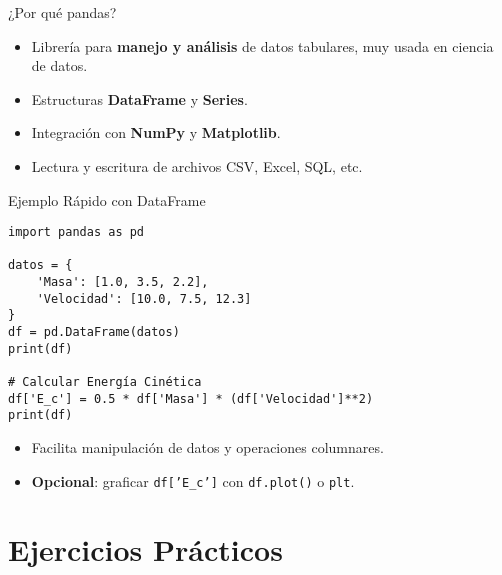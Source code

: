 \documentclass[10pt]{beamer}
\begin{document}
\begin{frame}{¿Por qué pandas?}
  \begin{itemize}
    \item Librería para \textbf{manejo y análisis} de datos tabulares, muy usada en ciencia de datos.
    \item Estructuras \textbf{DataFrame} y \textbf{Series}.
    \item Integración con \textbf{NumPy} y \textbf{Matplotlib}.
    \item Lectura y escritura de archivos CSV, Excel, SQL, etc.
  \end{itemize}
\end{frame}

\begin{frame}[fragile]{Ejemplo Rápido con DataFrame}
\begin{verbatim}
import pandas as pd

datos = {
    'Masa': [1.0, 3.5, 2.2],
    'Velocidad': [10.0, 7.5, 12.3]
}
df = pd.DataFrame(datos)
print(df)

# Calcular Energía Cinética
df['E_c'] = 0.5 * df['Masa'] * (df['Velocidad']**2)
print(df)
\end{verbatim}
\begin{itemize}
  \item Facilita manipulación de datos y operaciones columnares.
  \item \textbf{Opcional}: graficar \texttt{df['E\_c']} con \texttt{df.plot()} o \texttt{plt}.
\end{itemize}
\end{frame}

\section{Ejercicios Prácticos}
\end{document}
